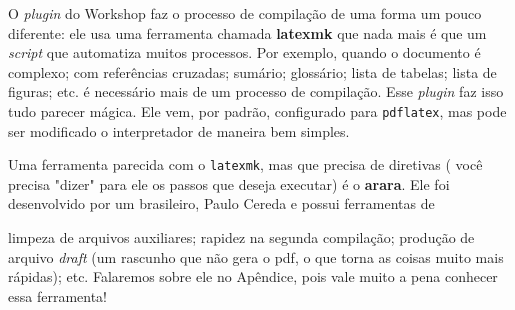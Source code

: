 O \textit{plugin}  do  Workshop faz o processo de compilação de uma
forma um pouco diferente: ele usa uma ferramenta chamada \textbf{latexmk} que 
nada mais é que um \textit{script} que automatiza muitos processos.
Por exemplo, quando o documento é complexo; com referências cruzadas; sumário; 
glossário; lista de tabelas; lista de figuras; etc. é necessário mais de um processo
de compilação. 
Esse \textit{plugin} faz isso tudo parecer mágica.
Ele vem, por padrão, configurado para \texttt{pdflatex}, mas pode ser modificado
o interpretador de maneira bem simples.

Uma ferramenta parecida com o \texttt{latexmk}, mas que precisa de diretivas (
você precisa "dizer" para ele os passos que deseja executar) é o \textbf{arara}.
Ele foi desenvolvido por um brasileiro, Paulo Cereda e possui ferramentas de 
limpeza de arquivos auxiliares; rapidez na segunda compilação; produção de arquivo 
\textit{draft} (um rascunho que não gera o pdf, o que torna as coisas muito mais 
rápidas); etc.
Falaremos sobre ele no Apêndice, pois vale muito a pena conhecer essa ferramenta!